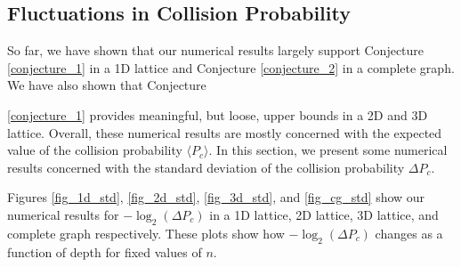 \documentclass[11pt]{article}
\theoremstyle{definition}
\theoremstyle{plain}
\begin{document}
\subsection{Fluctuations in Collision Probability}
So far, we have shown that our numerical results largely support Conjecture {\ref{conjecture_1}} in a 1D lattice and Conjecture {\ref{conjecture_2}} in a complete graph. We have also shown that Conjecture {\ref{conjecture_1} provides meaningful, but loose, upper bounds in a 2D and 3D lattice. Overall, these numerical results are mostly concerned with the expected value of the collision probability $\langle P_c \rangle$. In this section, we present some numerical results concerned with the standard deviation of the collision probability $\Delta P_c$.

Figures {\ref{fig_1d_std}}, {\ref{fig_2d_std}}, {\ref{fig_3d_std}}, and {\ref{fig_cg_std}} show our numerical results for $-\log_2 (\Delta P_c)$ in a 1D lattice, 2D lattice, 3D lattice, and complete graph respectively. These plots show how $-\log_2 (\Delta P_c)$ changes as a function of depth for fixed values of $n$. 

}
\end{document}
